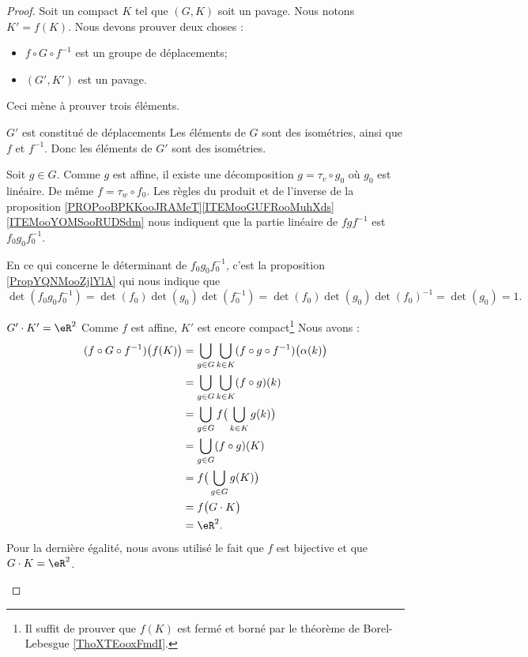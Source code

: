 \begin{proof}
	Soit un compact \( K\) tel que \( (G,K)\) soit un pavage. Nous notons \( K'=f(K)\). Nous devons prouver deux choses :
	\begin{itemize}
		\item \( f\circ G\circ f^{-1}\) est un groupe de déplacements;
		\item \( (G',K')\) est un pavage.
	\end{itemize}

	Ceci mène à prouver trois éléments.
	\begin{subproof}
		\item[\( G'\) est constitué de déplacements]
		Les éléments de \( G\) sont des isométries, ainsi que \( f\) et \( f^{-1}\). Donc les éléments de \( G'\) sont des isométries.

		Soit \( g\in G\). Comme \( g\) est affine, il existe une décomposition \( g=\tau_v\circ g_0\) où \( g_0\) est linéaire. De même \( f=\tau_w\circ f_0\). Les règles du produit et de l'inverse de la proposition \ref{PROPooBPKKooJRAMeT}\ref{ITEMooGUFRooMuhXds}\ref{ITEMooYOMSooRUDSdm} nous indiquent que la partie linéaire de \( fgf^{-1}\) est \( f_0g_0f_0^{-1}\).

		En ce qui concerne le déterminant de \( f_0g_0f_0^{-1}\), c'est la proposition \ref{PropYQNMooZjlYlA} qui nous indique que
		\begin{equation}
			\det(f_0g_0f_0^{-1})=\det(f_0)\det(g_0)\det(f_0^{-1})=\det(f_0)\det(g_0)\det(f_0)^{-1}=\det(g_0)=1.
		\end{equation}

		\item[\( G'\cdot K'=\eR^2\)]
		Comme \( f\) est affine, \( K'\) est encore compact\footnote{Il suffit de prouver que \( f(K)\) est fermé et borné par le théorème de Borel-Lebesgue \ref{ThoXTEooxFmdI}.} Nous avons :
		\begin{subequations}
			\begin{align}
				(f\circ G\circ f^{-1})\big( f(K) \big) & =\bigcup_{g\in G}\bigcup_{k\in K}(f\circ g\circ f^{-1})\big( \alpha(k) \big) \\
				                                       & =\bigcup_{g\in G}\bigcup_{k\in K}(f\circ g)(k)                               \\
				                                       & =\bigcup_{g\in G}f\big( \bigcup_{k\in K}g(k) \big)                           \\
				                                       & =\bigcup_{g\in G}(f\circ g)(K)                                               \\
				                                       & =f\big( \bigcup_{g\in G}g(K) \big)                                           \\
				                                       & =f\big( G\cdot K \big)                                                       \\
				                                       & =\eR^2.
			\end{align}
		\end{subequations}
		Pour la dernière égalité, nous avons utilisé le fait que \( f\) est bijective et que \( G\cdot K=\eR^2\).


\end{subproof}
\end{proof}
